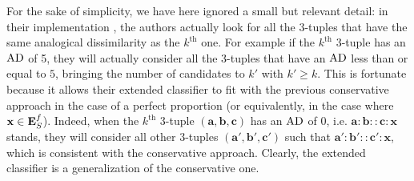 For the sake of simplicity, we have here ignored a small but relevant detail:
in their implementation \cite{BayMicDelIJCAI07}, the authors actually look for
all the 3-tuples that have the same analogical dissimilarity as the
$k^\text{th}$ one. For example if the $k^\text{th}$ 3-tuple has an $\text{AD}$ of 5,
they will actually consider all the $3$-tuples that have an $\text{AD}$ less than or
equal to $5$, bringing the number of candidates to $k'$ with $k' \geq k$. This
is fortunate because it allows their extended classifier to
fit with the previous conservative approach in the case of a perfect
proportion (or equivalently, in the case where $\mathbf{x} \in \mathbf{E}_{S}^{f}$).  Indeed,
when the $k^\text{th}$ $3$-tuple $(\mathbf{a}, \mathbf{b}, \mathbf{c})$ has an
$\text{AD}$ of $0$, i.e. $\mathbf{a} : \mathbf{b} :: \mathbf{c} : \mathbf{x}$ stands,
they will consider all other $3$-tuples $(\mathbf{a}',
\mathbf{b}',\mathbf{c}')$ such that $\mathbf{a}' : \mathbf{b}' :: \mathbf{c}' :
\mathbf{x}$, which is consistent with the conservative approach. Clearly, the
extended classifier is a generalization of the conservative one.


